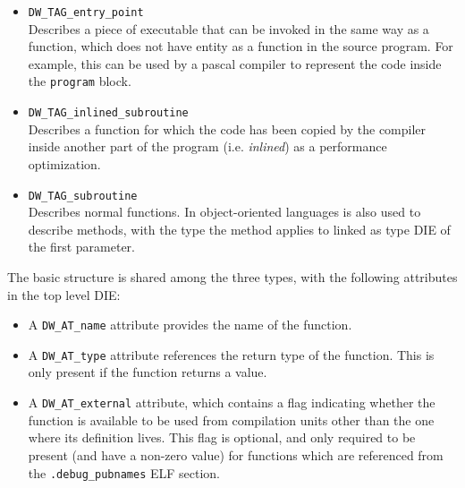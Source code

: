 \begin{itemize}
  \item \verb|DW_TAG_entry_point| \hfill \\
    Describes a piece of executable that can be invoked in the same way as
    a function, which does not have entity as a function in the source
    program. For example, this can be used by a \gls{pascal} compiler to
    represent the code inside the \texttt{program} block.
  \item \verb|DW_TAG_inlined_subroutine| \hfill \\
    Describes a function for which the code has
    been copied by the compiler inside another part of the program (i.e.
    \emph{inlined}) as a performance optimization.
  \item \verb|DW_TAG_subroutine| \hfill \\
    Describes normal functions. In \gls{object-oriented} languages is also
    used to describe methods, with the type the method applies to linked as
type DIE of the first parameter. \end{itemize}

The basic structure is shared among the three types, with the following
attributes in the top level DIE:

\begin{itemize}
  \item A \verb|DW_AT_name| attribute provides the name of the function.
  \item A \verb|DW_AT_type| attribute references the return type of the
    function. This is only present if the function returns a value.
  \item A \verb|DW_AT_external| attribute, which contains a flag indicating
    whether the function is available to be used from compilation units other
    than the one where its definition lives. This flag is optional, and only
    required to be present (and have a non-zero value) for functions which
    are referenced from the \verb|.debug_pubnames| ELF section.
\end{itemize}

